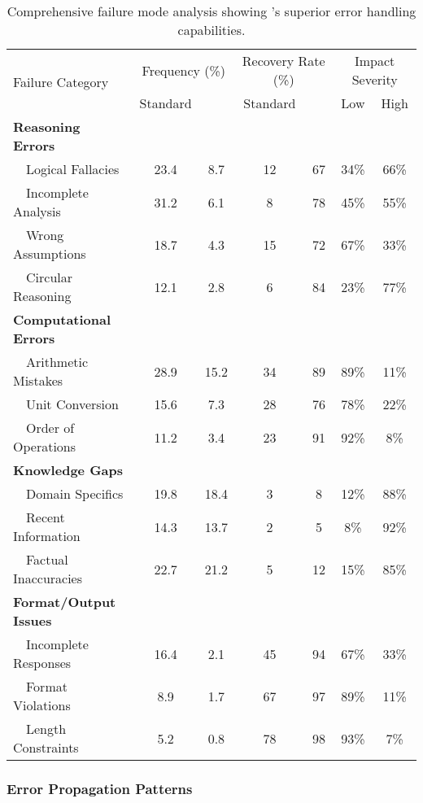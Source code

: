 \begin{table}[H]
\begin{table}[H]
\centering
\begin{tabular}{lcccccc}
\toprule
\multirow{2}{*}{Failure Category} & \multicolumn{2}{c}{Frequency (\%)} & \multicolumn{2}{c}{Recovery Rate (\%)} & \multicolumn{2}{c}{Impact Severity} \\
\cmidrule(lr){2-3} \cmidrule(lr){4-5} \cmidrule(lr){6-7}
& Standard & \supra{} & Standard & \supra{} & Low & High \\
\midrule
\textbf{Reasoning Errors} & & & & & & \\
\ \ Logical Fallacies & 23.4 & 8.7 & 12 & 67 & 34\% & 66\% \\
\ \ Incomplete Analysis & 31.2 & 6.1 & 8 & 78 & 45\% & 55\% \\
\ \ Wrong Assumptions & 18.7 & 4.3 & 15 & 72 & 67\% & 33\% \\
\ \ Circular Reasoning & 12.1 & 2.8 & 6 & 84 & 23\% & 77\% \\
\midrule
\textbf{Computational Errors} & & & & & & \\
\ \ Arithmetic Mistakes & 28.9 & 15.2 & 34 & 89 & 89\% & 11\% \\
\ \ Unit Conversion & 15.6 & 7.3 & 28 & 76 & 78\% & 22\% \\
\ \ Order of Operations & 11.2 & 3.4 & 23 & 91 & 92\% & 8\% \\
\midrule
\textbf{Knowledge Gaps} & & & & & & \\
\ \ Domain Specifics & 19.8 & 18.4 & 3 & 8 & 12\% & 88\% \\
\ \ Recent Information & 14.3 & 13.7 & 2 & 5 & 8\% & 92\% \\
\ \ Factual Inaccuracies & 22.7 & 21.2 & 5 & 12 & 15\% & 85\% \\
\midrule
\textbf{Format/Output Issues} & & & & & & \\
\ \ Incomplete Responses & 16.4 & 2.1 & 45 & 94 & 67\% & 33\% \\
\ \ Format Violations & 8.9 & 1.7 & 67 & 97 & 89\% & 11\% \\
\ \ Length Constraints & 5.2 & 0.8 & 78 & 98 & 93\% & 7\% \\
\bottomrule
\end{tabular}
\caption{Comprehensive failure mode analysis showing \supra{}'s superior error handling capabilities.}
\label{tab:failure-analysis}
\end{table}

\subsubsection{Error Propagation Patterns}


\end{table}
